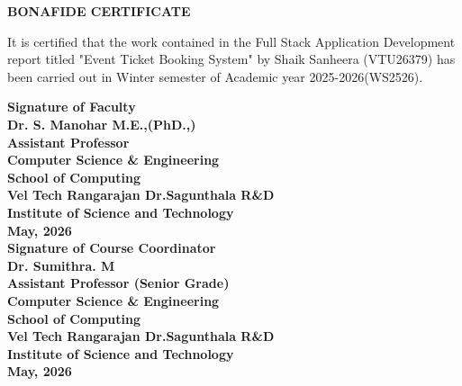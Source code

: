 \documentclass[12pt]{report}
\begin{document}
\newpage 
{} 
\begin{center} 
{\Huge \textbf{ BONAFIDE CERTIFICATE}}\\[0.5cm] 
\end{center} 
\linespread{1.5} 
\large{It is certified that the work contained in the Full Stack Application Development \\report titled "Event Ticket Booking System" by Shaik Sanheera (VTU26379) has been carried out in Winter semester of Academic year 2025-2026(WS2526).} 
\vspace{1.5cm} 
\begin{flushright} 
\textbf{Signature of Faculty\\Dr. S. Manohar M.E.,(PhD.,)\\Assistant Professor\\Computer Science \& 
Engineering\\School of Computing\\Vel Tech Rangarajan Dr.Sagunthala R\&D\\Institute of Science and Technology\\May, 2026}\\[2.0cm] 
\textbf{Signature of Course Coordinator\\Dr. Sumithra. M\\Assistant Professor (Senior Grade)\\Computer Science \& Engineering\\School of Computing\\Vel Tech Rangarajan Dr.Sagunthala R\&D\\Institute of Science and Technology\\May, 2026}\\  
\end{flushright} 
 
\end{document}
